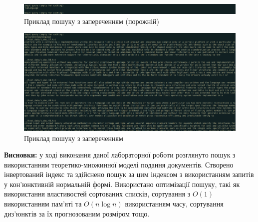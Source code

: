 \documentclass{../../templates/information_retrieval_lab}
\begin{document}
\begin{figure}[H]
    \centering
    \includegraphics[width=\textwidth]{img/screen3.png}
    \caption{Приклад пошуку з запереченням (порожній)}
\end{figure}

\begin{figure}[H]
    \centering
    \includegraphics[width=\textwidth]{img/screen4.png}
    \caption{Приклад пошуку з запереченням}
\end{figure}

\textbf{Висновки:} у ході виконання даної лабораторної роботи розглянуто пошук з використанням теоретико-множинної моделі подання документів. Створено інвертований індекс та здійснено пошук за цим індексом з використанням запитів у кон'юнктивній нормальній формі. Використано оптимізації пошуку, такі як використання властивостей сортованих списків, сортування з $O(1)$ використанням пам'яті та $O(n\log n)$ використанням часу, сортування диз'юнктів за їх прогнозованим розміром тощо.
\end{document}
